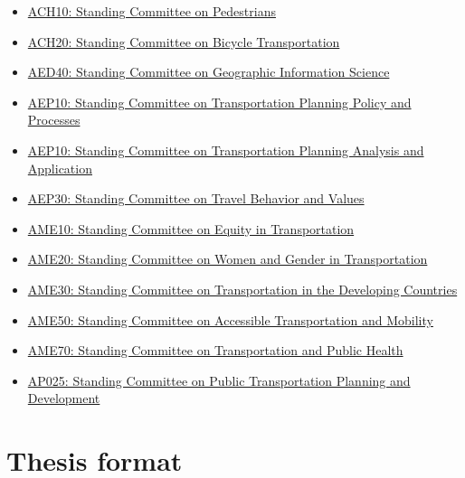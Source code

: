 \documentclass[]{tufte-book}
\providecommand{\tightlist}{%
  \setlength{\itemsep}{0pt}\setlength{\parskip}{0pt}}
\begin{document}
\begin{itemize}
\tightlist
\item
  \href{https://www.mytrb.org/OnlineDirectory/Committee/Details/5158}{ACH10: Standing Committee on Pedestrians}
\item
  \href{https://www.mytrb.org/OnlineDirectory/Committee/Details/5093}{ACH20: Standing Committee on Bicycle Transportation}
\item
  \href{https://www.mytrb.org/OnlineDirectory/Committee/Details/5139}{AED40: Standing Committee on Geographic Information Science}
\item
  \href{https://www.mytrb.org/OnlineDirectory/Committee/Details/5127}{AEP10: Standing Committee on Transportation Planning Policy and Processes}
\item
  \href{https://www.mytrb.org/OnlineDirectory/Committee/Details/5128}{AEP10: Standing Committee on Transportation Planning Analysis and Application}
\item
  \href{https://www.mytrb.org/OnlineDirectory/Committee/Details/5209}{AEP30: Standing Committee on Travel Behavior and Values}
\item
  \href{https://www.mytrb.org/OnlineDirectory/Committee/Details/5143}{AME10: Standing Committee on Equity in Transportation}
\item
  \href{https://www.mytrb.org/OnlineDirectory/Committee/Details/5162}{AME20: Standing Committee on Women and Gender in Transportation}
\item
  \href{https://www.mytrb.org/OnlineDirectory/Committee/Details/5114}{AME30: Standing Committee on Transportation in the Developing Countries}
\item
  \href{https://www.mytrb.org/OnlineDirectory/Committee/Details/5123}{AME50: Standing Committee on Accessible Transportation and Mobility}
\item
  \href{https://www.mytrb.org/OnlineDirectory/Committee/Details/5200}{AME70: Standing Committee on Transportation and Public Health}
\item
  \href{https://www.mytrb.org/OnlineDirectory/Committee/Details/1152}{AP025: Standing Committee on Public Transportation Planning and Development}
\end{itemize}

\hypertarget{thesis-format}{%
\chapter{Thesis format}\label{thesis-format}}
\end{document}
